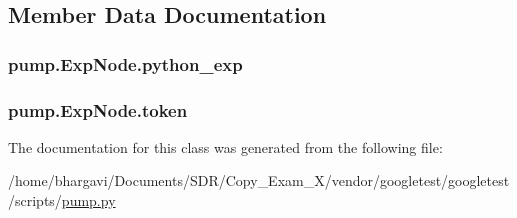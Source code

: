 \subsection{Member Data Documentation}
\subsubsection[{\texorpdfstring{python\+\_\+exp}{python_exp}}]{\setlength{\rightskip}{0pt plus 5cm}pump.\+Exp\+Node.\+python\+\_\+exp}\hypertarget{classpump_1_1_exp_node_adccfe4778c2e34f6b2c88118c0f1587f}{}\label{classpump_1_1_exp_node_adccfe4778c2e34f6b2c88118c0f1587f}
\subsubsection[{\texorpdfstring{token}{token}}]{\setlength{\rightskip}{0pt plus 5cm}pump.\+Exp\+Node.\+token}\hypertarget{classpump_1_1_exp_node_ade05a5a32535d717dc5c194569aaf356}{}\label{classpump_1_1_exp_node_ade05a5a32535d717dc5c194569aaf356}


The documentation for this class was generated from the following file\+:\begin{DoxyCompactItemize}
\item 
/home/bhargavi/\+Documents/\+S\+D\+R/\+Copy\+\_\+\+Exam\+\_\+X/vendor/googletest/googletest/scripts/\hyperlink{pump_8py}{pump.\+py}\end{DoxyCompactItemize}
